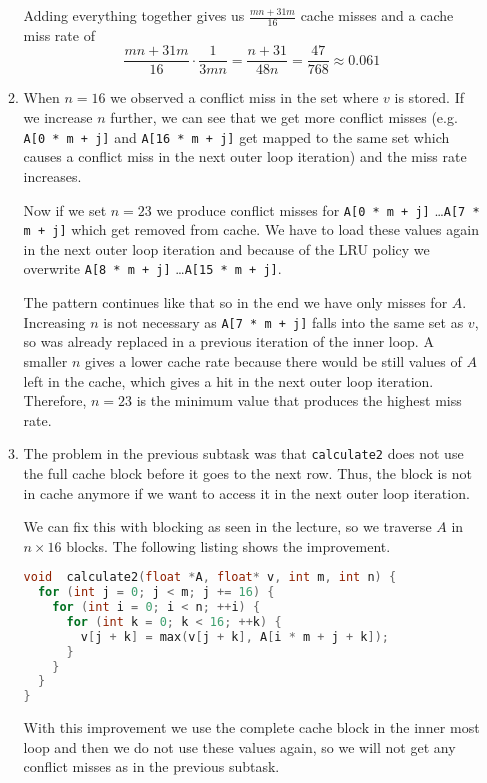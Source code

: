 \documentclass[a4paper]{article}
\begin{document}
\begin{enumerate}
\begin{enumerate}
                Adding everything together gives us $\frac{mn+31m}{16}$ cache
                misses and a cache miss rate of
                \begin{equation*}
                    \frac{mn+31m}{16} \cdot \frac{1}{3mn} = \frac{n+31}{48n}
                    = \frac{47}{768} \approx 0.061
                \end{equation*}
            \item When $n=16$ we observed a conflict miss in the set where
                $v$ is stored. If we increase $n$ further, we can see that we get more
                conflict misses (e.g. \texttt{A[0 * m + j]} and 
                \texttt{A[16 * m + j]} get mapped to the same set which causes
                a conflict miss in the next outer loop iteration) and the miss
                rate increases.

                Now if we set $n=23$ we produce conflict misses for 
                \texttt{A[0 * m + j]} \dots \texttt{A[7 * m + j]} which get
                removed from cache. We have to load these values again in the
                next outer loop iteration and because of the LRU policy we
                overwrite \texttt{A[8 * m + j]} \dots \texttt{A[15 * m + j]}.
                
                The pattern continues like that so in the end we have only
                misses for $A$. Increasing $n$ is not necessary as 
                \texttt{A[7 * m + j]} falls into the same set as $v$, so was
                already replaced in a previous iteration of the inner loop.
                A smaller $n$ gives a lower cache rate because there would be
                still values of $A$ left in the cache, which gives a hit in the
                next outer loop iteration. Therefore, $n=23$ is the minimum
                value that produces the highest miss rate.

            \item The problem in the previous subtask was that
                \texttt{calculate2} does not use the full cache block before it
                goes to the next row. Thus, the block is not in cache anymore
                if we want to access it in the next outer loop iteration.

                We can fix this with blocking as seen in the lecture, so we traverse 
                $A$ in $n \times 16$ blocks. The following listing shows the
                improvement.
                \begin{lstlisting}[language=C]
void  calculate2(float *A, float* v, int m, int n) {
  for (int j = 0; j < m; j += 16) {
    for (int i = 0; i < n; ++i) {
      for (int k = 0; k < 16; ++k) {
        v[j + k] = max(v[j + k], A[i * m + j + k]);
      }
    }
  }
}
\end{lstlisting}
               With this improvement we use the complete cache block in the
               inner most loop and then we do not use these values again, so we
               will not get any conflict misses as in the previous subtask.


\end{enumerate}
\end{enumerate}
\end{document}

